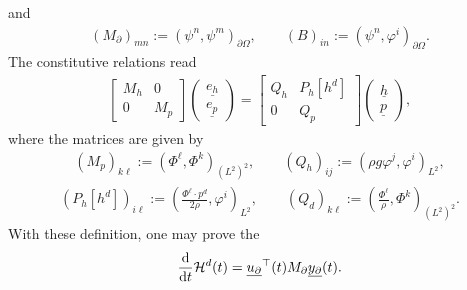 \documentclass[letterpaper,10pt,english]{sphinxmanual}
\begin{document}
\sphinxAtStartPar
and
\begin{equation*}
\begin{split}(M_\partial)_{mn} := \left( \psi^n, \psi^m \right)_{\partial\Omega}, \qquad (B)_{in} := \left( \psi^n, \varphi^i \right)_{\partial\Omega}.\end{split}
\end{equation*}
\sphinxAtStartPar
The constitutive relations read
\begin{equation*}
\begin{split}\begin{bmatrix} M_h & 0 \\ 0 & M_p \end{bmatrix} \begin{pmatrix} \underline{e_h} \\ \underline{e_p} \end{pmatrix}
=
\begin{bmatrix}
Q_h & P_h[h^d] \\
0 & Q_p
\end{bmatrix}
\begin{pmatrix} \underline{h} \\ \underline{p} \end{pmatrix},\end{split}
\end{equation*}
\sphinxAtStartPar
where the matrices are given by
\begin{equation*}
\begin{split}(M_p)_{k\ell} := \left( \Phi^\ell, \Phi^k \right)_{(L^2)^2}, \qquad (Q_h)_{ij} := \left( \rho g \varphi^j, \varphi^i \right)_{L^2},\end{split}
\end{equation*}\begin{equation*}
\begin{split}(P_h[h^d])_{i\ell} := \left( \frac{\Phi^\ell \cdot p^d}{2 \rho}, \varphi^i \right)_{L^2}, \qquad (Q_d)_{k\ell} := \left( \frac{\Phi^\ell}{\rho}, \Phi^k \right)_{(L^2)^2}.\end{split}
\end{equation*}
\sphinxAtStartPar
With these definition, one may prove the 
\begin{equation*}
\begin{split}\frac{\rm d}{{\rm d}t} \mathcal{H}^d(t) = \underline{u_\partial}^\top(t) M_\partial \underline{y_\partial}(t).\end{split}
\end{equation*}
\end{document}
